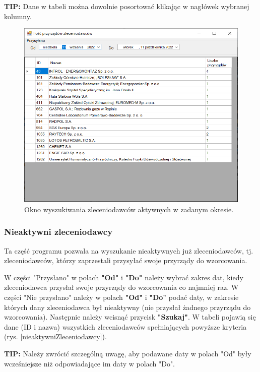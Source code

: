 \textbf{TIP:} Dane w tabeli można dowolnie posortować klikając w nagłówek wybranej kolumny.

\begin{figure}[htb]
	\centering
	\includegraphics{obrazki/Wyszukiwanie/Zleceniodawcy/ilosc_przyrzadow_zleceniodawcow.png}
	\caption{Okno wyszukiwania zleceniodawców aktywnych w zadanym okresie.}
	\label{aktywniZleceniodawcy}
\end{figure}

\subsubsection{Nieaktywni zleceniodawcy}
\label{sort_nieprzysylajacych}

Ta część programu pozwala na wyszukanie nieaktywnych już zleceniodawców, tj. zleceniodawców, którzy zaprzestali przysyłać swoje przyrządy do wzorcowania.

W części "Przysłano" w polach \textbf{"Od"} i \textbf{"Do"} należy wybrać zakres dat, kiedy zleceniodawca przysłał swoje przyrządy do wzorcowania co najmniej raz. W części "Nie przysłano" należy w polach \textbf{"Od"} i \textbf{"Do"} podać daty, w zakresie których dany zleceniodawca był nieaktywny (nie przysłał żadnego przyrządu do wzorcowania). Następnie należy wcisnąć przycisk \textbf{"Szukaj"}. W tabeli pojawią się dane (ID i nazwa) wszystkich zleceniodawców spełniających powyższe kryteria (rys. \ref{nieaktywniZleceniodawcy}).

\textbf{TIP:} Należy zwrócić szczególną uwagę, aby podawane daty w polach "Od" były wcześniejsze niż odpowiadające im daty w polach "Do".

